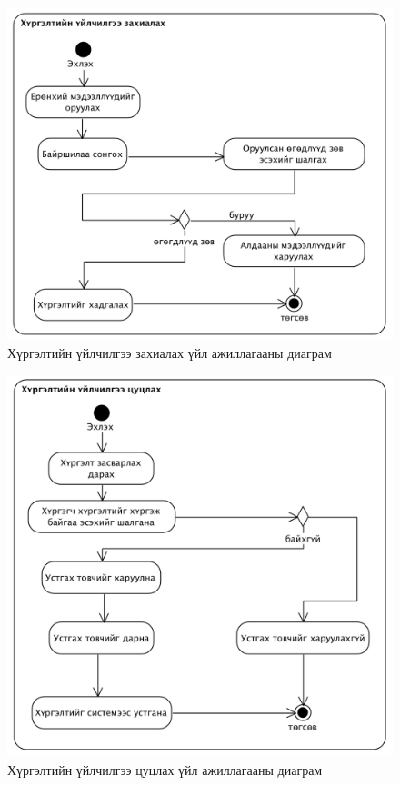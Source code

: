 \begin{figure}[H]
  \centering
	\includegraphics[width=\textwidth]{Figures/shinjilgee/activity/hurgeltiin_uilchilgee_zahialah.png}
	\caption{Хүргэлтийн үйлчилгээ захиалах үйл ажиллагааны диаграм}
\end{figure}

\begin{figure}[H]
  \centering
	\includegraphics[width=\textwidth]{Figures/shinjilgee/activity/hurgeltiin_uilchilgee_tsutslah.png}
	\caption{Хүргэлтийн үйлчилгээ цуцлах үйл ажиллагааны диаграм}
\end{figure}

